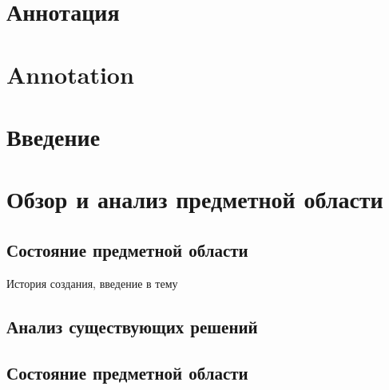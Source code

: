 \documentclass[a4paper,14pt]{article}
\begin{document}


\section*{Аннотация}


\pagebreak

\section*{Annotation}

\pagebreak

\tableofcontents
\pagebreak

\section*{Введение}

\section{Обзор и анализ предметной области}

\subsection{Состояние предметной области}

История создания, введение в тему %

\subsection{Анализ существующих решений}







\subsection{Состояние предметной области}
\end{document}
